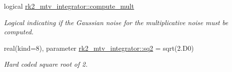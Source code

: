 \begin{DoxyCompactItemize}
logical \hyperlink{namespacerk2__mtv__integrator_ad56fffe540caff2644799cc5510e93c9}{rk2\+\_\+mtv\+\_\+integrator\+::compute\+\_\+mult}
\begin{DoxyCompactList}\small\item\em Logical indicating if the Gaussian noise for the multiplicative noise must be computed. \end{DoxyCompactList}\item 
real(kind=8), parameter \hyperlink{namespacerk2__mtv__integrator_afebf6d33084a6677b313e21740aa6b8b}{rk2\+\_\+mtv\+\_\+integrator\+::sq2} = sqrt(2.D0)
\begin{DoxyCompactList}\small\item\em Hard coded square root of 2. \end{DoxyCompactList}\end{DoxyCompactItemize}
